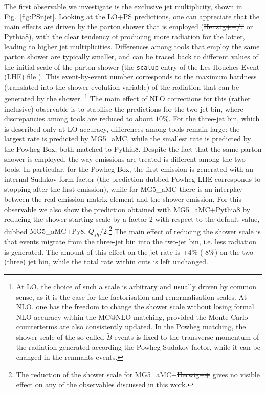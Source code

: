 \documentclass[twocolumn,epjc3]{svjour3} %
\providecommand{\DIFaddtex}[1]{{\protect\color{blue}\uwave{#1}}} %
\providecommand{\DIFdeltex}[1]{{\protect\color{red}\sout{#1}}}                      %
\providecommand{\DIFaddbegin}{} %
\providecommand{\DIFaddend}{} %
\providecommand{\DIFdelbegin}{} %
\providecommand{\DIFdelend}{} %
\providecommand{\DIFadd}[1]{\texorpdfstring{\DIFaddtex{#1}}{#1}} %
\providecommand{\DIFdel}[1]{\texorpdfstring{\DIFdeltex{#1}}{}} %
\begin{document}
The first observable we investigate is the exclusive jet multiplicity, shown in Fig.~\ref{fig:PSnjet}. Looking at the LO+PS predictions, one can appreciate that the
main effects are driven by the parton shower that is employed ({\sc \DIFdelbegin \DIFdel{Herwig++/7}\DIFdelend \DIFaddbegin \DIFadd{Herwig7}\DIFaddend } or {\sc Pythia8}), with the clear tendency of producing more radiation for the latter,
leading to higher jet multiplicities. Differences among tools that employ the same parton shower are typically smaller, and can be traced back to different values of the
initial scale of the parton shower (the {\tt scalup} entry of the Les Houches Event (LHE) file \cite{Alwall:2006yp,Butterworth:2010ym}). This event-by-event number corresponds
to the maximum hardness (translated into the shower evolution variable) of the radiation that
can be generated by the shower. \footnote{At LO, the choice of such a scale is arbitrary and usually driven by common sense,
as it is the case for the factorisation and renormalisation scales.
    At NLO, one has the freedom to change the shower scale without losing formal NLO accuracy within the {\sc MC@NLO} matching,
    provided the Monte Carlo counterterms are also consistently
updated. In the {\sc Powheg} matching, the shower scale of the so-called $\tilde B$ events is fixed to the transverse momentum of the radiation
generated according the {\sc Powheg} Sudakov factor, while it can be changed in the remnants events.}
The main effect of NLO corrections for this (rather inclusive) observable is to stabilise the predictions for the two-jet bin, where discrepancies
among tools are reduced to about $10\%$. For the three-jet bin, which is described only at LO accuracy, differences among tools remain large: the largest rate is predicted by
{\sc MG5\_aMC}, while the smallest rate is predicted by the {\sc Powheg-Box}, both matched to {\sc Pythia8}. Despite the fact that the same parton shower is employed, the way emissions are treated
is different among the two tools. In particular, for the {\sc Powheg-Box}, the first emission is generated with an internal Sudakov form factor (the
prediction dubbed {\sc Powheg-LHE} corresponds to stopping after the first emission), while for {\sc MG5\_aMC} there is an
interplay between the real-emission matrix element and the shower emission. For this observable we also show the prediction obtained
with {\sc MG5\_aMC+Pythia8} by reducing the shower-starting scale by a factor 2 with respect to the default value, dubbed 
{\sc MG5\_aMC+Py8, $Q_{sh}/2$}.\footnote{The reduction of the shower scale for {\sc MG5\_aMC+\DIFdelbegin \DIFdel{Herwig++}\DIFdelend \DIFaddbegin \DIFadd{Herwig7}\DIFaddend } gives no visible effect on any of the observables 
discussed in this work.} The main effect of reducing the shower scale is that events migrate from the three-jet bin into the two-jet bin, i.e. less radiation is generated. The
amount of this effect on the jet rate is +4\% (-8\%) on the two (three) jet bin, while the total rate within cuts is left unchanged.  
\end{document}
